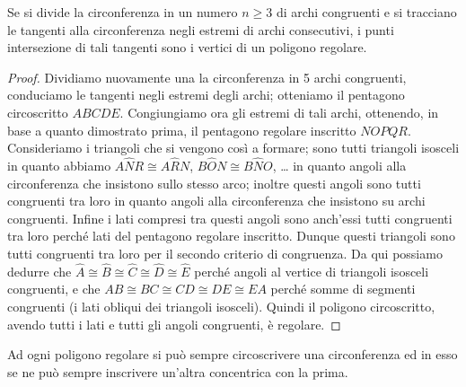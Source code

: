 \begin{teorema}
Se si divide la circonferenza in un numero \(n\geq 3\) di archi 
congruenti e si tracciano le tangenti alla circonferenza negli  
estremi di archi consecutivi, i punti intersezione di tali tangenti 
sono i vertici di un poligono regolare.
\end{teorema}


\begin{inaccessibleblock}
 \begin{figure}[!htb]
	\centering
\end{figure}
\end{inaccessibleblock}

\begin{proof}
Dividiamo nuovamente una la circonferenza in 5 archi congruenti, 
conduciamo le tangenti negli estremi degli archi; otteniamo il 
pentagono circoscritto \(ABCDE\).
Congiungiamo ora gli estremi di tali archi, ottenendo, in base a 
quanto dimostrato prima, il pentagono regolare inscritto \(NOPQR\). 
Consideriamo i triangoli che si vengono così a formare; sono tutti 
triangoli isosceli in quanto abbiamo \(A\widehat{N}R\cong 
A\widehat{R}N\), \(B\widehat{O}N\cong B\widehat{N}O\), \ldots{} in 
quanto angoli alla circonferenza che insistono sullo stesso arco; 
inoltre questi angoli sono tutti congruenti tra loro in quanto angoli 
alla circonferenza che insistono su archi congruenti. Infine i lati 
compresi tra questi angoli sono anch'essi tutti congruenti tra loro 
perché lati del pentagono regolare inscritto. Dunque questi triangoli 
sono tutti congruenti tra loro per il secondo criterio di congruenza. 
Da qui possiamo dedurre che \(\widehat{A}\cong \widehat{B}\cong 
\widehat{C}\cong \widehat{D}\cong \widehat{E}\) perché angoli al 
vertice di triangoli isosceli congruenti, e che \(AB\cong BC\cong 
CD\cong DE\cong EA\) perché somme di segmenti congruenti (i lati 
obliqui dei triangoli isosceli). Quindi il poligono circoscritto, 
avendo tutti i lati e tutti gli angoli congruenti, è regolare.
\end{proof}

\begin{teorema}\label{teo:poly_reg_circ_inscr_circos}
Ad ogni poligono regolare si può sempre circoscrivere una 
circonferenza ed in esso se ne può sempre inscrivere un'altra 
concentrica con la prima.
\end{teorema}


\begin{inaccessibleblock}
 \begin{figure}[!htb]
	\centering
\end{figure}
\end{inaccessibleblock}

